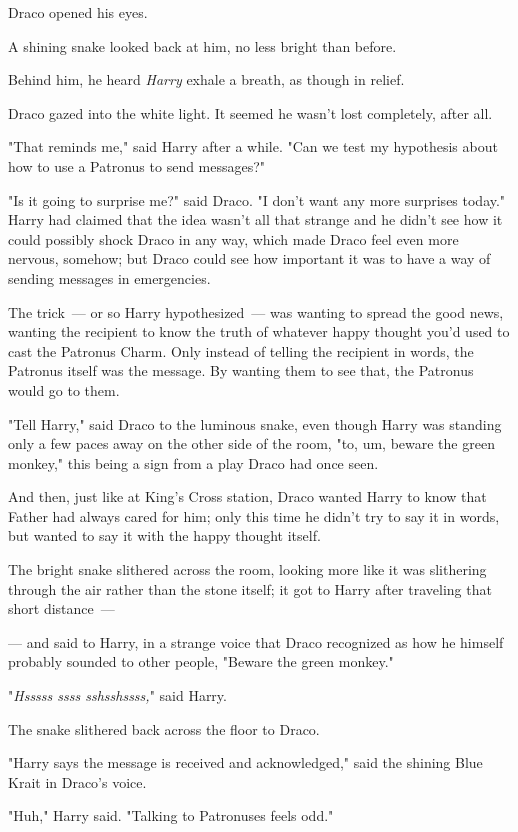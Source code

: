 Draco opened his eyes.

A shining snake looked back at him, no less bright than before.

Behind him, he heard \emph{Harry} exhale a breath, as though in relief.

Draco gazed into the white light. It seemed he wasn't lost completely, after
all.

"That reminds me," said Harry after a while. "Can we test my hypothesis about
how to use a Patronus to send messages?"

"Is it going to surprise me?" said Draco. "I don't want any more surprises
today."
\sbreak
Harry had claimed that the idea wasn't all that strange and he didn't see how
it could possibly shock Draco in any way, which made Draco feel even more
nervous, somehow; but Draco could see how important it was to have a way of
sending messages in emergencies.

The trick~--- or so Harry hypothesized~--- was wanting to spread the good news,
wanting the recipient to know the truth of whatever happy thought you'd used to
cast the Patronus Charm. Only instead of telling the recipient in words, the
Patronus itself was the message. By wanting them to see that, the Patronus
would go to them.

"Tell Harry," said Draco to the luminous snake, even though Harry was standing
only a few paces away on the other side of the room, "to, um, beware the green
monkey," this being a sign from a play Draco had once seen.

And then, just like at King's Cross station, Draco wanted Harry to know that
Father had always cared for him; only this time he didn't try to say it in
words, but wanted to say it with the happy thought itself.

The bright snake slithered across the room, looking more like it was slithering
through the air rather than the stone itself; it got to Harry after traveling
that short distance~---

--- and said to Harry, in a strange voice that Draco recognized as how he
himself probably sounded to other people, "Beware the green monkey."

"\emph{Hsssss ssss sshsshssss,}" said Harry.

The snake slithered back across the floor to Draco.

"Harry says the message is received and acknowledged," said the shining Blue
Krait in Draco's voice.

"Huh," Harry said. "Talking to Patronuses feels odd."

